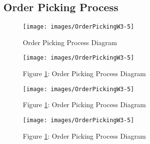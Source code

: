 \begin{appendices}
\addtocounter{chapter}{1}
\renewcommand{\sectionmark}[1]{%
\markboth{\textbf{#1}}{}}

\section{Order Picking Process}
\vspace*{-2cm}
\begin{figure}[H]
	\texttt{[image: images/OrderPickingW3-5]}
	\caption{Order Picking Process Diagram \citep{image:logwearOrderPicking}}
	\label{fig:orderPickingProcessDiagram}
\end{figure}
\begin{figure}\ContinuedFloat
	\texttt{[image: images/OrderPickingW3-5]}
	\caption*{Figure \ref{fig:orderPickingProcessDiagram}: Order Picking Process Diagram \citep{image:logwearOrderPicking}}
\end{figure}
\begin{figure}\ContinuedFloat
	\texttt{[image: images/OrderPickingW3-5]}
	\caption*{Figure \ref{fig:orderPickingProcessDiagram}: Order Picking Process Diagram \citep{image:logwearOrderPicking}}
\end{figure}
\begin{figure}\ContinuedFloat
	\texttt{[image: images/OrderPickingW3-5]}
	\caption*{Figure \ref{fig:orderPickingProcessDiagram}: Order Picking Process Diagram \citep{image:logwearOrderPicking}}
\end{figure}
\end{appendices}